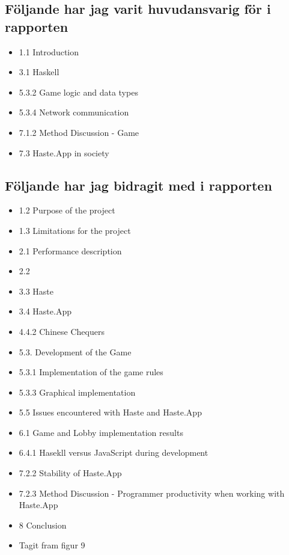 \subsection{Följande har jag varit huvudansvarig för i rapporten}
\begin{itemize}
    \item 1.1 Introduction
    \item 3.1 Haskell
    \item 5.3.2 Game logic and data types
    \item 5.3.4 Network communication
    \item 7.1.2 Method Discussion - Game
    \item 7.3 Haste.App in society
\end{itemize}

\subsection{Följande har jag bidragit med i rapporten}
\begin{itemize}
    \item 1.2 Purpose of the project
    \item 1.3 Limitations for the project
    \item 2.1 Performance description
    \item 2.2 
    \item 3.3 Haste
    \item 3.4 Haste.App
    \item 4.4.2 Chinese Chequers
    \item 5.3. Development of the Game
    \item 5.3.1 Implementation of the game rules
    \item 5.3.3 Graphical implementation
    \item 5.5 Issues encountered with Haste and Haste.App
    \item 6.1 Game and Lobby implementation results
    \item 6.4.1 Hasekll versus JavaScript during development
    \item 7.2.2 Stability of Haste.App
    \item 7.2.3 Method Discussion - Programmer productivity when working with Haste.App
    \item 8 Conclusion
    \item Tagit fram figur 9
\end{itemize}